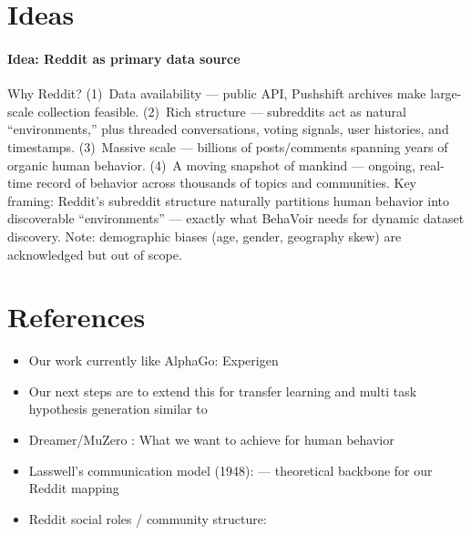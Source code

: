 %

\newcommand{\idea}[2]{\paragraph{Idea: #1} #2}
\newcommand{\reference}[2]{\paragraph{Ref: #1} #2}
\newcommand{\snippet}[1]{\begin{quote}\textit{#1}\end{quote}}

\section{Ideas}

\idea{Reddit as primary data source}{Why Reddit? (1)~Data availability --- public API, Pushshift archives make large-scale collection feasible. (2)~Rich structure --- subreddits act as natural ``environments,'' plus threaded conversations, voting signals, user histories, and timestamps. (3)~Massive scale --- billions of posts/comments spanning years of organic human behavior. (4)~A moving snapshot of mankind --- ongoing, real-time record of behavior across thousands of topics and communities. Key framing: Reddit's subreddit structure naturally partitions human behavior into discoverable ``environments'' --- exactly what BehaVoir needs for dynamic dataset discovery. Note: demographic biases (age, gender, geography skew) are acknowledged but out of scope.}

\section{References}
\begin{itemize}
    \item Our work currently like AlphaGo: Experigen \cite{gupta_accelerating_2026}
    \item Our next steps are to extend this for transfer learning and multi task hypothesis generation similar to \cite{silver_mastering_2017}
    \item Dreamer/MuZero \cite{schrittwieser_mastering_2020}: What we want to achieve for human behavior\cite{hafner_dream_2020}
    \item Lasswell's communication model (1948): \cite{lasswell1948structure} --- theoretical backbone for our Reddit mapping
    \item Reddit social roles / community structure: \cite{buntain2014identifying}
\end{itemize}



